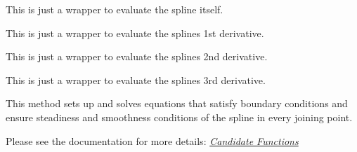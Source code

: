 \documentclass[letterpaper,10pt,english]{sphinxmanual}
\begin{document}
\begin{fulllineitems}
\begin{fulllineitems}
\label{pytrajectory:pytrajectory.spline.CubicSpline.f}
This is just a wrapper to evaluate the spline itself.

\end{fulllineitems}


\begin{fulllineitems}
\label{pytrajectory:pytrajectory.spline.CubicSpline.df}
This is just a wrapper to evaluate the splines 1st derivative.

\end{fulllineitems}


\begin{fulllineitems}
\label{pytrajectory:pytrajectory.spline.CubicSpline.ddf}
This is just a wrapper to evaluate the splines 2nd derivative.

\end{fulllineitems}


\begin{fulllineitems}
\label{pytrajectory:pytrajectory.spline.CubicSpline.dddf}
This is just a wrapper to evaluate the splines 3rd derivative.

\end{fulllineitems}


\begin{fulllineitems}
\label{pytrajectory:pytrajectory.spline.CubicSpline.makesteady}
This method sets up and solves equations that satisfy boundary conditions and
ensure steadiness and smoothness conditions of the spline in every joining point.

Please see the documentation for more details: {\hyperref[guide/background:candidate-functions]{\emph{Candidate Functions}}}

\end{fulllineitems}



\end{fulllineitems}
\end{document}
